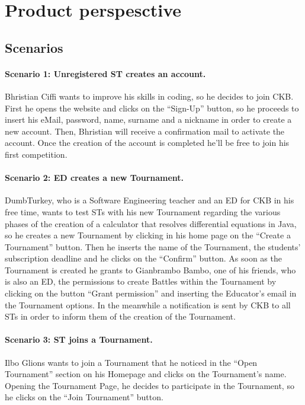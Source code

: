 \section{Product perspesctive}
\label{sec:product_perspesctive}%

\subsection{Scenarios}
\label{subsec:scenarios}%
\paragraph{Scenario 1: Unregistered ST creates an account.}
Bhristian Ciffi wants to improve his skills in coding, so he decides to join CKB. First he opens the website and clicks on the “Sign-Up” button, so he proceeds to insert his eMail, password, name, surname and a nickname in order to create a new account. Then, Bhristian will receive a confirmation mail to activate the account. Once the creation of the account is completed he’ll be free to join his first competition.

\paragraph{Scenario 2: ED creates a new Tournament.}
DumbTurkey, who is a Software Engineering teacher and an ED for CKB in his free time, wants to test STs with his new Tournament regarding the various phases of the creation of a calculator that resolves differential equations in Java, so he creates a new Tournament by clicking in his home page on the “Create a Tournament” button. Then he inserts the name of the Tournament, the students’ subscription deadline and he clicks on the “Confirm” button. As soon as the Tournament is created he grants to Gianbrambo Bambo, one of his friends, who is also an ED, the permissions to create Battles within the Tournament by clicking on the button “Grant permission” and inserting the Educator’s email in the Tournament options. In the meanwhile a notification is sent by CKB to all STs in order to inform them of the creation of the Tournament.

\paragraph{Scenario 3: ST joins a Tournament.}
Ilbo Glions wants to join a Tournament that he noticed in the “Open Tournament” section on his Homepage and clicks on the Tournament’s name. Opening the Tournament Page, he decides to participate in the Tournament, so he clicks on the “Join Tournament” button. 

